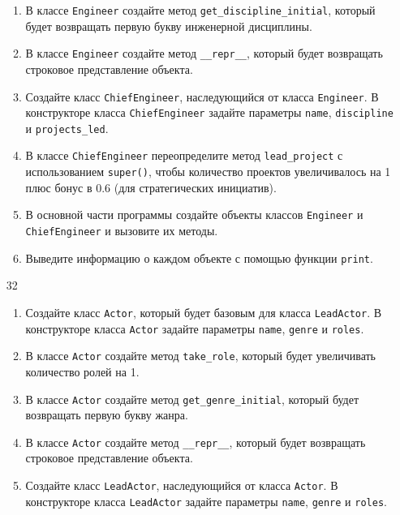 \begin{enumerate}
\begin{enumerate}
    \item В классе \texttt{Engineer} создайте метод \texttt{get\_discipline\_initial}, который будет возвращать первую букву инженерной дисциплины.
    
    \item В классе \texttt{Engineer} создайте метод \texttt{\_\_repr\_\_}, который будет возвращать строковое представление объекта.
    
    \item Создайте класс \texttt{ChiefEngineer}, наследующийся от класса \texttt{Engineer}. В конструкторе класса \texttt{ChiefEngineer} задайте параметры \texttt{name}, \texttt{discipline} и \texttt{projects\_led}.
    
    \item В классе \texttt{ChiefEngineer} переопределите метод \texttt{lead\_project} с использованием \texttt{super()}, чтобы количество проектов увеличивалось на 1 плюс бонус в 0.6 (для стратегических инициатив).
    
    \item В основной части программы создайте объекты классов \texttt{Engineer} и \texttt{ChiefEngineer} и вызовите их методы.
    
    \item Выведите информацию о каждом объекте с помощью функции \texttt{print}.
\end{enumerate}

\item[32] 
\begin{enumerate}
    \item Создайте класс \texttt{Actor}, который будет базовым для класса \texttt{LeadActor}. В конструкторе класса \texttt{Actor} задайте параметры \texttt{name}, \texttt{genre} и \texttt{roles}.
    
    \item В классе \texttt{Actor} создайте метод \texttt{take\_role}, который будет увеличивать количество ролей на 1.
    
    \item В классе \texttt{Actor} создайте метод \texttt{get\_genre\_initial}, который будет возвращать первую букву жанра.
    
    \item В классе \texttt{Actor} создайте метод \texttt{\_\_repr\_\_}, который будет возвращать строковое представление объекта.
    
    \item Создайте класс \texttt{LeadActor}, наследующийся от класса \texttt{Actor}. В конструкторе класса \texttt{LeadActor} задайте параметры \texttt{name}, \texttt{genre} и \texttt{roles}.
    

\end{enumerate}
\end{enumerate}
